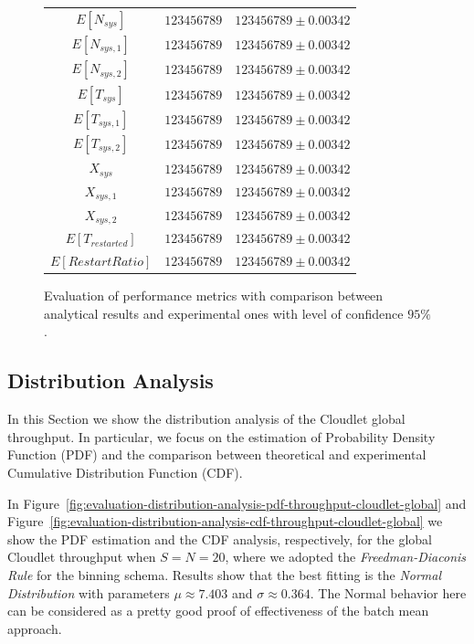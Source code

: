 \begin{figure}
\begin{center}
\begin{tabular}{|c||c|c|}
			\hline
			$E[N_{sys}]$  & $123456789$ & $123456789\pm 0.00342$ \\
			$E[N_{sys,1}]$  & $123456789$ & $123456789\pm 0.00342$ \\
			$E[N_{sys,2}]$  & $123456789$ & $123456789\pm 0.00342$ \\
			$E[T_{sys}]$  & $123456789$ & $123456789\pm 0.00342$ \\
			$E[T_{sys,1}]$  & $123456789$ & $123456789\pm 0.00342$ \\
			$E[T_{sys,2}]$  & $123456789$ & $123456789\pm 0.00342$ \\
			$X_{sys}$  & $123456789$ & $123456789\pm 0.00342$ \\
			$X_{sys,1}$  & $123456789$ & $123456789\pm 0.00342$ \\
			$X_{sys,2}$  & $123456789$ & $123456789\pm 0.00342$ \\
			\hline
			$E[T_{restarted}]$  & $123456789$ & $123456789\pm 0.00342$ \\
			$E[RestartRatio]$  & $123456789$ & $123456789\pm 0.00342$ \\			
			\hline
		\end{tabular}
	\end{center}
	\caption{Evaluation of performance metrics with comparison between analytical results and experimental ones with level of confidence $95\%$.}
	\label{tbl:evaluation}
\end{figure}

\subsection{Distribution Analysis}
\label{sec:evaluation-distribution-analysis}
In this Section we show the distribution analysis of the Cloudlet global throughput. 
In particular, we focus on the estimation of Probability Density Function (PDF) and the comparison between theoretical and experimental Cumulative Distribution Function (CDF).

In Figure~\ref{fig:evaluation-distribution-analysis-pdf-throughput-cloudlet-global} and  Figure~\ref{fig:evaluation-distribution-analysis-cdf-throughput-cloudlet-global} we show the PDF estimation and the CDF analysis, respectively, for the global Cloudlet throughput when $S=N=20$, where we adopted the \textit{Freedman-Diaconis Rule} for the binning schema.
Results show that the best fitting is the \textit{Normal Distribution} with parameters $\mu\approx7.403$ and $\sigma\approx0.364$.
%
The Normal behavior here can be considered as a pretty good proof of effectiveness of the batch mean approach. 

